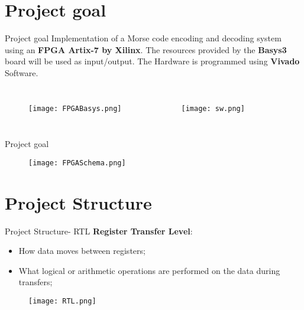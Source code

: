 \documentclass[9pt]{beamer}
\begin{document}
\section{Project goal}
\begin{frame}{Project goal}
Implementation of a Morse code encoding and decoding system using an \textbf{FPGA Artix-7 by Xilinx}. The resources provided by the \textbf{Basys3} board will be used as input/output.
The Hardware is programmed using \textbf{Vivado} Software.
\begin{columns}
\begin{figure}
    \centering
    \texttt{[image: FPGABasys.png]}
    \label{fig:enter-label}
\end{figure}
\begin{figure}
    \centering
    \texttt{[image: sw.png]}
    \label{fig:enter-label}
\end{figure}
\end{columns}
\end{frame}


\begin{frame}{Project goal}

\begin{figure}
           \centering
           
           \texttt{[image: FPGASchema.png]}
\end{figure}

\end{frame}





\section{Project Structure}

\begin{frame}{Project Structure- RTL}
    \textbf{Register Transfer Level}: 
    \begin{itemize}
        \item How data moves between registers;
        \item What logical or arithmetic operations are performed on the data during transfers;
    \end{itemize}
    

    \begin{figure}
           \centering
           
           \texttt{[image: RTL.png]}
\end{figure}
\end{frame}
\end{document}
